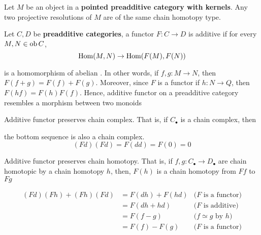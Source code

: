 \begin{corollary}
	Let $M$ be an object in a \textbf{pointed preadditive category with kernels}. Any two projective resolutions of $M$ are of the same chain homotopy type.
\end{corollary}

\begin{definition}
	Let $C, D$ be \textbf{preadditive categories}, a functor $F: C \to D$ is additive if for every $M, N \in \operatorname{ob} C$,
	$$
	\operatorname{Hom}(M, N) \to \operatorname{Hom}(F(M), F(N))
	$$
	
	is a homomorphism of abelian . In other words, if $f, g: M \to N$, then $F(f + g) = F(f) + F(g)$. Moreover, since $F$ is a functor if $h: N \to Q$, then $F(hf) = F(h) F(f)$. Hence, additive functor on a preadditive category resembles a morphism between two monoids
\end{definition}

\begin{remark}
	Additive functor preserves chain complex. That is, if $C_\bullet$ is a chain complex, then
	\begin{center}
	\end{center}
	
	the bottom sequence is also a chain complex.
	$$
	(Fd)(Fd) = F(dd) = F(0) = 0
	$$
\end{remark}

\begin{remark}
	Additive functor preserves chain homotopy. That is, if $f, g: C_\bullet \to D_\bullet$ are chain homotopic by a chain homotopy $h$, then, $F(h)$ is a chain homotopy from $Ff$ to $Fg$
	
	\begin{align*}
		(Fd) (Fh) + (Fh) (Fd)
		&= F(dh) + F(hd) &\text{($F$ is a functor)} \\
		&= F(dh + hd) &\text{($F$ is additive)} \\
		&= F(f - g) &\text{($f \simeq g$ by $h$)} \\
		&= F(f) - F(g) &\text{($F$ is a functor)}
	\end{align*}
	
\end{remark}

